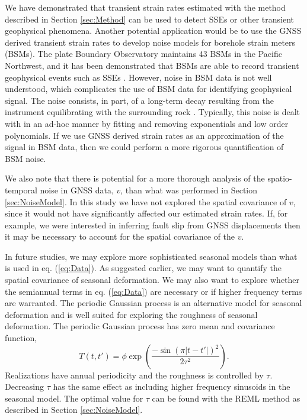 \documentclass[10pt,letter]{article}
\begin{document}
We have demonstrated that transient strain rates estimated with the method described in Section \ref{sec:Method} can be used to detect SSEs or other transient geophysical phenomena. Another potential application would be to use the GNSS derived transient strain rates to develop noise models for borehole strain meters (BSMs). The plate Boundary Observatory maintains 43 BSMs in the Pacific Northwest, and it has been demonstrated that BSMs are able to record transient geophysical events such as SSEs \citep[e.g.,][]{Dragert2011}. However, noise in BSM data is not well understood, which complicates the use of BSM data for identifying geophysical signal. The noise consists, in part, of a long-term decay resulting from the instrument equilibrating with the surrounding rock \citep{Gladwin1987}. Typically, this noise is dealt with in an ad-hoc manner by fitting and removing exponentials and low order polynomials. If we use GNSS derived strain rates as an approximation of the signal in BSM data, then we could perform a more rigorous quantification of BSM noise.    

We also note that there is potential for a more thorough analysis of the spatio-temporal noise in GNSS data, $v$, than what was performed in Section \ref{sec:NoiseModel}. In this study we have not explored the spatial covariance of $v$, since it would not have significantly affected our estimated strain rates. If, for example, we were interested in inferring fault slip from GNSS displacements then it may be necessary to account for the spatial covariance of the $v$.  

In future studies, we may explore more sophisticated seasonal models than what is used in eq. (\ref{eq:Data}). As suggested earlier, we may want to quantify the spatial covariance of seasonal deformation. We may also want to explore whether the semiannual terms in eq. (\ref{eq:Data}) are necessary or if higher frequency terms are warranted.  The periodic Gaussian process \citep{Mackay1998} is an alternative model for seasonal deformation and is well suited for exploring the roughness of seasonal deformation.  The periodic Gaussian process has zero mean and covariance function,
\begin{equation}\label{eq:Periodic}
T(t,t') = \phi \exp\left(\frac{-\sin(\pi|t - t'|)^2}{2\tau^2}\right).
\end{equation}
Realizations have annual periodicity and the roughness is controlled by $\tau$. Decreasing $\tau$ has the same effect as including higher frequency sinusoids in the seasonal model. The optimal value for $\tau$ can be found with the REML method as described in Section \ref{sec:NoiseModel}. 
\end{document}
